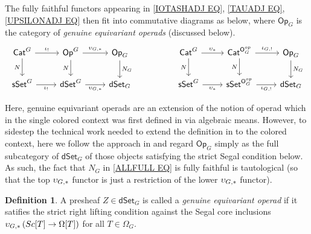 \documentclass[a4paper,10pt
,draft
]{article}%
\numberwithin{equation}{section}
\numberwithin{figure}{section}
\theoremstyle{definition} %
\newtheorem{definition}[equation]{Definition}%
\newcommand{\dSet}{\mathsf{dSet}}
\newcommand{\1}{\ensuremath{\mathbbm 1}}%
\begin{document}
The fully faithful functors appearing in 
\eqref{IOTASHADJ EQ},
\eqref{TAUADJ EQ},
\eqref{UPSILONADJ EQ}
then fit into commutative diagrams
as below, where $\mathsf{Op}_G$
is the category of \emph{genuine equivariant operads} (discussed below).
\begin{equation}\label{ALLFULL EQ}
\begin{tikzcd}
\mathsf{Cat}^G
\ar{r}{\iota_!}
\ar{d}[swap]{N}
&
\mathsf{Op}^G
\ar{r}{\upsilon_{G,\**}}
\ar{d}[swap]{N}
&
\mathsf{Op}_G
\ar{d}{N_G}
&&
\mathsf{Cat}^G
\ar{r}{\upsilon_{\**}}
\ar{d}[swap]{N}
&
\mathsf{Cat}^{\mathsf{O}_G^{op}}
\ar{r}{\iota_{G,!}}
\ar{d}[swap]{N}
&
\mathsf{Op}_G
\ar{d}{N_G}
\\
\mathsf{sSet}^G
\ar{r}[swap]{\iota_!}
&
\mathsf{dSet}^G
\ar{r}[swap]{\upsilon_{G,\**}}
&
\mathsf{dSet}_G
&&
\mathsf{sSet}^G
\ar{r}[swap]{\upsilon_{\**}}
&
\mathsf{sSet}^{\mathsf{O}_G^{op}}
\ar{r}[swap]{\iota_{G,!}}
&
\mathsf{dSet}_G
\end{tikzcd}
\end{equation}


Here, genuine equivariant operads are an extension of the notion of operad
which in the single colored context was 
first defined in \cite{BP_geo}
via algebraic means. 
However, to sidestep the technical work needed to extend 
the definition in \cite{BP_geo} 
to the colored context,
here we follow the approach in
\cite[Def. 3.35]{BP_edss}
and regard $\mathsf{Op}_G$
simply as the full subcategory of 
$\mathsf{dSet}_G$
of those objects satisfying the strict Segal condition below.
As such, 
the fact that $N_G$ in \eqref{ALLFULL EQ}
is fully faithful is tautological
(so that the top 
$\upsilon_{G,\**}$ functor
is just a restriction of 
the lower $\upsilon_{G,\**}$ functor).

\begin{definition}\label{OPG_DEF}
	A presheaf $Z \in \dSet_G$ is called a \textit{genuine equivariant operad} if
	it satifies the strict right lifting condition against the Segal core inclusions
	$\upsilon_{G,\**}\left(Sc[T] \to \Omega[T] \right)$ for all $T \in \Omega_G$.
\end{definition}
\end{document}
